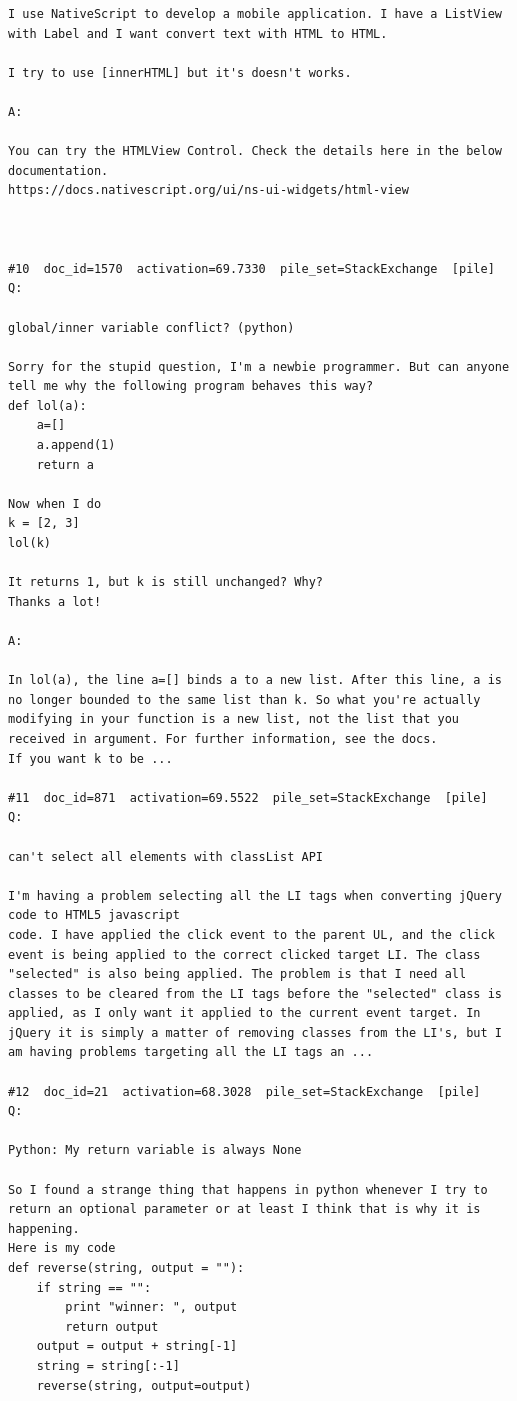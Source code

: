 \begin{verbatim}
I use NativeScript to develop a mobile application. I have a ListView with Label and I want convert text with HTML to HTML.

I try to use [innerHTML] but it's doesn't works.

A:

You can try the HTMLView Control. Check the details here in the below documentation.
https://docs.nativescript.org/ui/ns-ui-widgets/html-view



#10  doc_id=1570  activation=69.7330  pile_set=StackExchange  [pile]
Q:

global/inner variable conflict? (python)

Sorry for the stupid question, I'm a newbie programmer. But can anyone tell me why the following program behaves this way?
def lol(a):
    a=[]
    a.append(1)
    return a

Now when I do 
k = [2, 3]
lol(k)

It returns 1, but k is still unchanged? Why?
Thanks a lot!

A:

In lol(a), the line a=[] binds a to a new list. After this line, a is no longer bounded to the same list than k. So what you're actually modifying in your function is a new list, not the list that you received in argument. For further information, see the docs.
If you want k to be ...

#11  doc_id=871  activation=69.5522  pile_set=StackExchange  [pile]
Q:

can't select all elements with classList API

I'm having a problem selecting all the LI tags when converting jQuery code to HTML5 javascript
code. I have applied the click event to the parent UL, and the click event is being applied to the correct clicked target LI. The class "selected" is also being applied. The problem is that I need all classes to be cleared from the LI tags before the "selected" class is applied, as I only want it applied to the current event target. In jQuery it is simply a matter of removing classes from the LI's, but I am having problems targeting all the LI tags an ...

#12  doc_id=21  activation=68.3028  pile_set=StackExchange  [pile]
Q:

Python: My return variable is always None

So I found a strange thing that happens in python whenever I try to return an optional parameter or at least I think that is why it is happening.
Here is my code
def reverse(string, output = ""):
    if string == "":
        print "winner: ", output
        return output
    output = output + string[-1]
    string = string[:-1]
    reverse(string, output=output)


\end{verbatim}
